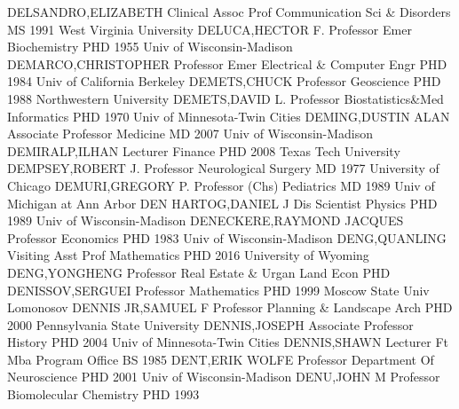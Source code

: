 \documentclass[
]{article}
\begin{document}
 \textbar DELSANDRO,ELIZABETH \textbar Clinical Assoc Prof
\textbar Communication Sci \& Disorders \textbar MS 1991 West Virginia
University \textbar{}  \textbar DELUCA,HECTOR F.
\textbar Professor Emer \textbar Biochemistry \textbar PHD 1955 Univ of
Wisconsin-Madison \textbar{}  \textbar DEMARCO,CHRISTOPHER
\textbar Professor Emer \textbar Electrical \& Computer Engr
\textbar PHD 1984 Univ of California Berkeley \textbar{} 
\textbar DEMETS,CHUCK \textbar Professor \textbar Geoscience
\textbar PHD 1988 Northwestern University \textbar{} 
\textbar DEMETS,DAVID L. \textbar Professor \textbar Biostatistics\&Med
Informatics \textbar PHD 1970 Univ of Minnesota-Twin Cities \textbar{}
 \textbar DEMING,DUSTIN ALAN \textbar Associate Professor
\textbar Medicine \textbar MD 2007 Univ of Wisconsin-Madison \textbar{}
 \textbar DEMIRALP,ILHAN \textbar Lecturer \textbar Finance
\textbar PHD 2008 Texas Tech University \textbar{} 
\textbar DEMPSEY,ROBERT J. \textbar Professor \textbar Neurological
Surgery \textbar MD 1977 University of Chicago \textbar{} 
\textbar DEMURI,GREGORY P. \textbar Professor (Chs) \textbar Pediatrics
\textbar MD 1989 Univ of Michigan at Ann Arbor \textbar{} 
\textbar DEN HARTOG,DANIEL J \textbar Dis Scientist \textbar Physics
\textbar PHD 1989 Univ of Wisconsin-Madison \textbar{} 
\textbar DENECKERE,RAYMOND JACQUES \textbar Professor \textbar Economics
\textbar PHD 1983 Univ of Wisconsin-Madison \textbar{} 
\textbar DENG,QUANLING \textbar Visiting Asst Prof \textbar Mathematics
\textbar PHD 2016 University of Wyoming \textbar{} 
\textbar DENG,YONGHENG \textbar Professor \textbar Real Estate \& Urgan
Land Econ \textbar PHD \textbar{}  \textbar DENISSOV,SERGUEI
\textbar Professor \textbar Mathematics \textbar PHD 1999 Moscow State
Univ Lomonosov \textbar{}  \textbar DENNIS JR,SAMUEL F
\textbar Professor \textbar Planning \& Landscape Arch \textbar PHD 2000
Pennsylvania State University \textbar{} 
\textbar DENNIS,JOSEPH \textbar Associate Professor \textbar History
\textbar PHD 2004 Univ of Minnesota-Twin Cities \textbar{} 
\textbar DENNIS,SHAWN \textbar Lecturer \textbar Ft Mba Program Office
\textbar BS 1985 \textbar{}  \textbar DENT,ERIK WOLFE
\textbar Professor \textbar Department Of Neuroscience \textbar PHD 2001
Univ of Wisconsin-Madison \textbar{}  \textbar DENU,JOHN M
\textbar Professor \textbar Biomolecular Chemistry \textbar PHD 1993
\end{document}
